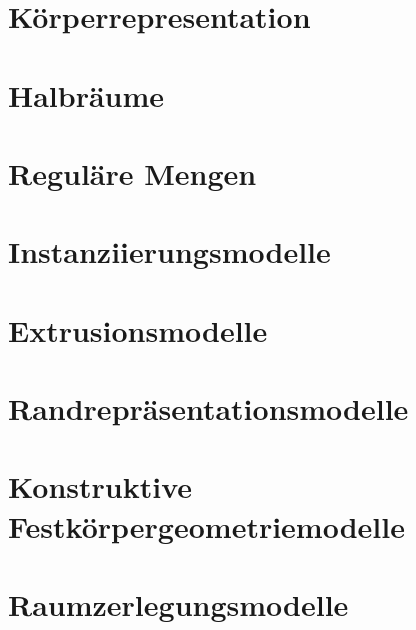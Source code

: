 \section{Körperrepresentation}

\section{Halbräume}

\section{Reguläre Mengen}

\section{Instanziierungsmodelle}

\section{Extrusionsmodelle}

\section{Randrepräsentationsmodelle}

\section{Konstruktive Festkörpergeometriemodelle}

\section{Raumzerlegungsmodelle}

